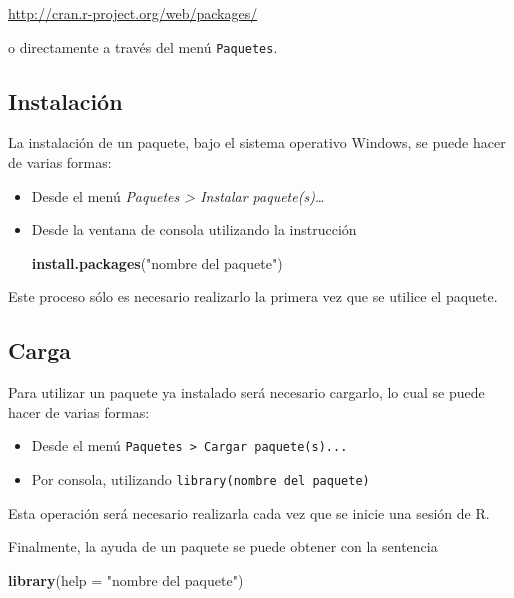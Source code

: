 \documentclass[]{book}
\newenvironment{Shaded}{\begin{snugshade}}{\end{snugshade}}
\newcommand{\DataTypeTok}[1]{\textcolor[rgb]{0.13,0.29,0.53}{#1}}
\newcommand{\KeywordTok}[1]{\textcolor[rgb]{0.13,0.29,0.53}{\textbf{#1}}}
\newcommand{\NormalTok}[1]{#1}
\newcommand{\StringTok}[1]{\textcolor[rgb]{0.31,0.60,0.02}{#1}}
\begin{document}
\url{http://cran.r-project.org/web/packages/}

o directamente a través del menú \texttt{Paquetes}.

\hypertarget{instalacion-pkg}{%
\subsection{Instalación}\label{instalacion-pkg}}

La instalación de un paquete, bajo el sistema
operativo Windows, se puede hacer de varias formas:

\begin{itemize}
\item
  Desde el menú \emph{Paquetes \textgreater{} Instalar paquete(s)\ldots{}}
\item
  Desde la ventana de consola utilizando la instrucción

\begin{Shaded}
\begin{Highlighting}[]
\KeywordTok{install.packages}\NormalTok{(}\StringTok{"nombre del paquete"}\NormalTok{)}
\end{Highlighting}
\end{Shaded}
\end{itemize}

Este proceso sólo es necesario realizarlo la primera vez que se utilice
el paquete.

\hypertarget{carga}{%
\subsection{Carga}\label{carga}}

Para utilizar un paquete ya instalado será necesario cargarlo, lo cual se puede hacer de
varias formas:

\begin{itemize}
\item
  Desde el menú \texttt{Paquetes\ \textgreater{}\ Cargar\ paquete(s)...}
\item
  Por consola, utilizando \texttt{library(nombre\ del\ paquete)}
\end{itemize}

Esta operación será necesario realizarla cada vez que se inicie una
sesión de R.

Finalmente, la ayuda de un paquete se puede obtener con la sentencia

\begin{Shaded}
\begin{Highlighting}[]
\KeywordTok{library}\NormalTok{(}\DataTypeTok{help =} \StringTok{"nombre del paquete"}\NormalTok{) }
\end{Highlighting}
\end{Shaded}
\end{document}
